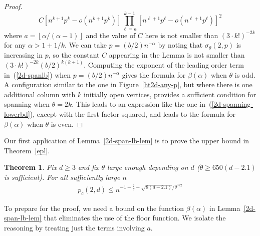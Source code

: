 \documentclass{amsart}
\newcommand{\floor}[1]{\left\lfloor#1\right \rfloor}
\newcommand{\threshold}{\theta}
\numberwithin{equation}{section}
\newtheorem{theorem}{Theorem}[section]
\theoremstyle{definition}
\theoremstyle{remark}
\begin{document}
\begin{proof}
\begin{equation}
\label{2d-spanlb}
C \left[n^{k+1}p^k - o(n^{k+1}p^k)\right] \prod_{\ell = a}^{k-1} \left[ n^{\ell + 1}p^{\ell} - o(n^{\ell+1}p^\ell)\right]^2
\end{equation}
where $a = \floor{\alpha / (\alpha-1)}$ and the value of $C$ here is not smaller than $(3\cdot k!)^{-2k}$ for any $\alpha>1+1/k$.  We can take $p = (b/2)n^{-\alpha}$ by noting  that $\sigma_\threshold(2,p)$ is increasing in $p$, so the constant $C$ appearing in the Lemma is not smaller than $(3\cdot k!)^{-2k}(b/2)^{k(k+1)}$.  Computing the exponent of the leading order term in~(\ref{2d-spanlb}) when $p = (b/2)n^{-\alpha}$ gives the formula for $\beta(\alpha)$ when $\theta$ is odd.  A configuration similar to the one in Figure~\ref{ht2d-any-p}, but where there is one additional column with $k$ initially open vertices, provides a sufficient condition for spanning when $\theta = 2k$.  This leads to an expression like the one in~(\ref{2d-spanning-lowerbd}), except with the first factor squared, and leads to the formula for $\beta(\alpha)$ when $\theta$ is even.
\end{proof}

Our first application of Lemma~\ref{2d-span-lb-lem} is to prove the upper bound in Theorem~\ref{epl}.

\begin{theorem}
\label{2d-largetheta-upper-thm}
Fix $d\geq 3$ and fix $\theta$ large enough depending on $d$ ($\theta \geq 650(d-2.1)$ is sufficient).  For all sufficiently large $n$
\begin{align*}
p_c(2,d) \leq n^{-1 - \frac{2}{\theta} - \sqrt{8(d-2.1)}/\theta^{3/2}}
\end{align*}
\end{theorem}

To prepare for the proof, we need a bound on the function $\beta(\alpha)$ in Lemma~\ref{2d-span-lb-lem} that eliminates the use of the floor function.  We isolate the reasoning by treating just the terms involving $a$.
\end{document}
